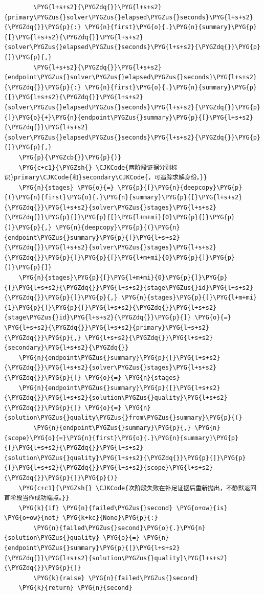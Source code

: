 \begin{Verbatim}
        \PYG{l+s+s2}{\PYGZdq{}}\PYG{l+s+s2}{primary\PYGZus{}solver\PYGZus{}elapsed\PYGZus{}seconds}\PYG{l+s+s2}{\PYGZdq{}}\PYG{p}{:} \PYG{n}{first}\PYG{o}{.}\PYG{n}{summary}\PYG{p}{[}\PYG{l+s+s2}{\PYGZdq{}}\PYG{l+s+s2}{solver\PYGZus{}elapsed\PYGZus{}seconds}\PYG{l+s+s2}{\PYGZdq{}}\PYG{p}{]}\PYG{p}{,}
        \PYG{l+s+s2}{\PYGZdq{}}\PYG{l+s+s2}{endpoint\PYGZus{}solver\PYGZus{}elapsed\PYGZus{}seconds}\PYG{l+s+s2}{\PYGZdq{}}\PYG{p}{:} \PYG{n}{first}\PYG{o}{.}\PYG{n}{summary}\PYG{p}{[}\PYG{l+s+s2}{\PYGZdq{}}\PYG{l+s+s2}{solver\PYGZus{}elapsed\PYGZus{}seconds}\PYG{l+s+s2}{\PYGZdq{}}\PYG{p}{]}\PYG{o}{+}\PYG{n}{endpoint\PYGZus{}summary}\PYG{p}{[}\PYG{l+s+s2}{\PYGZdq{}}\PYG{l+s+s2}{solver\PYGZus{}elapsed\PYGZus{}seconds}\PYG{l+s+s2}{\PYGZdq{}}\PYG{p}{]}\PYG{p}{,}
    \PYG{p}{\PYGZcb{}}\PYG{p}{)}
    \PYG{c+c1}{\PYGZsh{} \CJKCode{两阶段证据分别标识}primary\CJKCode{和}secondary\CJKCode{，可追踪求解身份。}}
    \PYG{n}{stages} \PYG{o}{=} \PYG{p}{[}\PYG{n}{deepcopy}\PYG{p}{(}\PYG{n}{first}\PYG{o}{.}\PYG{n}{summary}\PYG{p}{[}\PYG{l+s+s2}{\PYGZdq{}}\PYG{l+s+s2}{solver\PYGZus{}stages}\PYG{l+s+s2}{\PYGZdq{}}\PYG{p}{]}\PYG{p}{[}\PYG{l+m+mi}{0}\PYG{p}{]}\PYG{p}{)}\PYG{p}{,} \PYG{n}{deepcopy}\PYG{p}{(}\PYG{n}{endpoint\PYGZus{}summary}\PYG{p}{[}\PYG{l+s+s2}{\PYGZdq{}}\PYG{l+s+s2}{solver\PYGZus{}stages}\PYG{l+s+s2}{\PYGZdq{}}\PYG{p}{]}\PYG{p}{[}\PYG{l+m+mi}{0}\PYG{p}{]}\PYG{p}{)}\PYG{p}{]}
    \PYG{n}{stages}\PYG{p}{[}\PYG{l+m+mi}{0}\PYG{p}{]}\PYG{p}{[}\PYG{l+s+s2}{\PYGZdq{}}\PYG{l+s+s2}{stage\PYGZus{}id}\PYG{l+s+s2}{\PYGZdq{}}\PYG{p}{]}\PYG{p}{,} \PYG{n}{stages}\PYG{p}{[}\PYG{l+m+mi}{1}\PYG{p}{]}\PYG{p}{[}\PYG{l+s+s2}{\PYGZdq{}}\PYG{l+s+s2}{stage\PYGZus{}id}\PYG{l+s+s2}{\PYGZdq{}}\PYG{p}{]} \PYG{o}{=} \PYG{l+s+s2}{\PYGZdq{}}\PYG{l+s+s2}{primary}\PYG{l+s+s2}{\PYGZdq{}}\PYG{p}{,} \PYG{l+s+s2}{\PYGZdq{}}\PYG{l+s+s2}{secondary}\PYG{l+s+s2}{\PYGZdq{}}
    \PYG{n}{endpoint\PYGZus{}summary}\PYG{p}{[}\PYG{l+s+s2}{\PYGZdq{}}\PYG{l+s+s2}{solver\PYGZus{}stages}\PYG{l+s+s2}{\PYGZdq{}}\PYG{p}{]} \PYG{o}{=} \PYG{n}{stages}
    \PYG{n}{endpoint\PYGZus{}summary}\PYG{p}{[}\PYG{l+s+s2}{\PYGZdq{}}\PYG{l+s+s2}{solution\PYGZus{}quality}\PYG{l+s+s2}{\PYGZdq{}}\PYG{p}{]} \PYG{o}{=} \PYG{n}{solution\PYGZus{}quality\PYGZus{}from\PYGZus{}summary}\PYG{p}{(}
        \PYG{n}{endpoint\PYGZus{}summary}\PYG{p}{,} \PYG{n}{scope}\PYG{o}{=}\PYG{n}{first}\PYG{o}{.}\PYG{n}{summary}\PYG{p}{[}\PYG{l+s+s2}{\PYGZdq{}}\PYG{l+s+s2}{solution\PYGZus{}quality}\PYG{l+s+s2}{\PYGZdq{}}\PYG{p}{]}\PYG{p}{[}\PYG{l+s+s2}{\PYGZdq{}}\PYG{l+s+s2}{scope}\PYG{l+s+s2}{\PYGZdq{}}\PYG{p}{]}\PYG{p}{)}
    \PYG{c+c1}{\PYGZsh{} \CJKCode{次阶段失败在补足证据后重新抛出，不静默返回首阶段当作成功端点。}}
    \PYG{k}{if} \PYG{n}{failed\PYGZus{}second} \PYG{o+ow}{is} \PYG{o+ow}{not} \PYG{k+kc}{None}\PYG{p}{:}
        \PYG{n}{failed\PYGZus{}second}\PYG{o}{.}\PYG{n}{solution\PYGZus{}quality} \PYG{o}{=} \PYG{n}{endpoint\PYGZus{}summary}\PYG{p}{[}\PYG{l+s+s2}{\PYGZdq{}}\PYG{l+s+s2}{solution\PYGZus{}quality}\PYG{l+s+s2}{\PYGZdq{}}\PYG{p}{]}
        \PYG{k}{raise} \PYG{n}{failed\PYGZus{}second}
    \PYG{k}{return} \PYG{n}{second}
\end{Verbatim}
